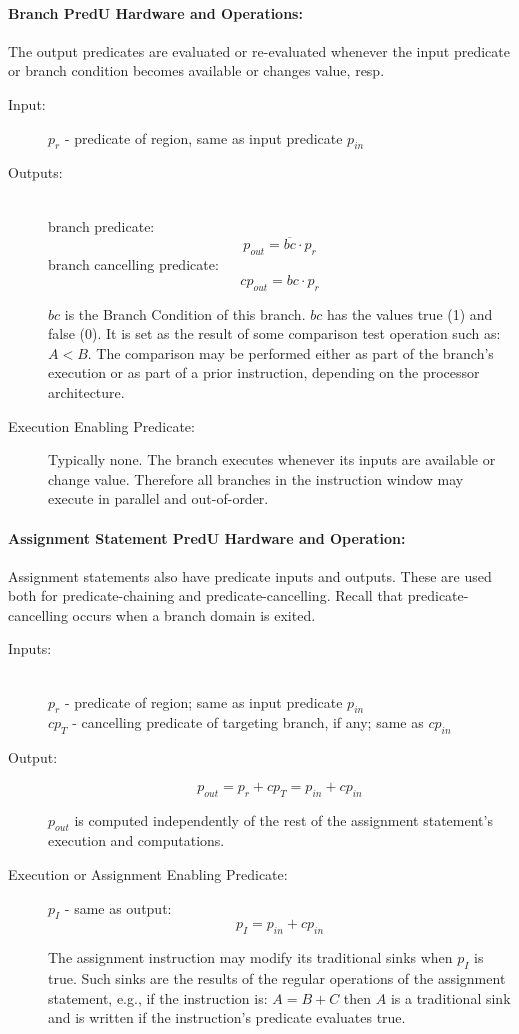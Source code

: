 \documentclass[10pt,dvips]{article}
\begin{document}
\paragraph{Branch PredU Hardware and Operations: }
The output predicates are evaluated or re-evaluated whenever the input
predicate or branch condition becomes available or changes value, resp.
\begin{description}
\item[Input:] $p_r$ - predicate of region, same as input predicate $p_{in}$
\item[Outputs:] \[ \]
\vspace{-0.6in}\\
branch predicate: \[p_{out} = \overline{bc} \cdot p_r\] 
branch cancelling predicate: \[cp_{out} = bc \cdot p_r\]

$bc$ is the Branch Condition of
this branch. $bc$ has the values true (1) and false (0). It is set as the result
of some comparison test operation such as: $A < B$. The comparison may be performed
either as part of the branch's execution or as part of a prior instruction,
depending on the processor architecture.

\item[Execution Enabling Predicate:] Typically none. The branch executes
whenever its inputs are available or change value. Therefore all branches in the
instruction window may execute in parallel and out-of-order.
\end{description}

\paragraph{Assignment Statement PredU Hardware and Operation: }
Assignment statements also have predicate inputs and outputs.
These are used both for predicate-chaining and predicate-cancelling.
Recall that predicate-cancelling occurs when a branch domain is exited.

\begin{description}
\item[Inputs:] \[ \]
\vspace{-0.6in}\\
$p_r$ - predicate of region; same as input predicate $p_{in}$\\
$cp_T$ - cancelling predicate of targeting branch, if any; same as $cp_{in}$

\item[Output:] \[p_{out} = p_r + cp_T = p_{in} + cp_{in}\]

$p_{out}$ is computed independently of the rest of the assignment statement's
execution and computations.

\item[Execution or Assignment Enabling Predicate:] $p_I$ - same as output:
\[p_I = p_{in} + cp_{in}\]

The assignment instruction may modify its traditional sinks when $p_I$ is true.
Such sinks are the results of the regular operations of the assignment statement,
e.g., if the instruction is: $A = B + C$ then $A$ is a traditional sink and is
written if the instruction's predicate evaluates true.
\end{description}
\end{document}
